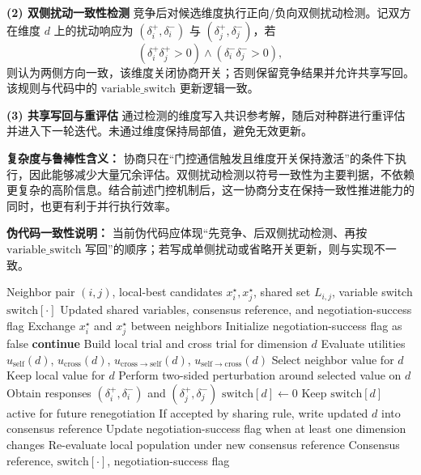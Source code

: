 \documentclass[conference]{IEEEtran}
\begin{document}
\textbf{(2) 双侧扰动一致性检测}  
竞争后对候选维度执行正向/负向双侧扰动检测。记双方在维度 \(d\) 上的扰动响应为
\((\delta_i^+,\delta_i^-)\) 与 \((\delta_j^+,\delta_j^-)\)，若
\[
(\delta_i^+\delta_j^+>0)\land(\delta_i^-\delta_j^->0),
\]
则认为两侧方向一致，该维度关闭协商开关；否则保留竞争结果并允许共享写回。该规则与代码中的 \(\mathrm{variable\_switch}\) 更新逻辑一致。

\textbf{(3) 共享写回与重评估}  
通过检测的维度写入共识参考解，随后对种群进行重评估并进入下一轮迭代。未通过维度保持局部值，避免无效更新。

\textbf{复杂度与鲁棒性含义：}
协商只在“门控通信触发且维度开关保持激活”的条件下执行，因此能够减少大量冗余评估。双侧扰动检测以符号一致性为主要判据，不依赖更复杂的高阶信息。结合前述门控机制后，这一协商分支在保持一致性推进能力的同时，也更有利于并行执行效率。

\textbf{伪代码一致性说明：} 当前伪代码应体现“先竞争、后双侧扰动检测、再按 \(\mathrm{variable\_switch}\) 写回”的顺序；若写成单侧扰动或省略开关更新，则与实现不一致。

\begin{algorithm}[t]
  \footnotesize
  \caption{Negotiation with Two-Sided Consistency Check (Abstract)}
  \label{alg:negotiation_consistency}
  \begin{algorithmic}[1]
  \Require Neighbor pair $(i,j)$, local-best candidates $x_i^\star,x_j^\star$, shared set $L_{i,j}$, variable switch $\mathrm{switch}[\cdot]$
  \Ensure Updated shared variables, consensus reference, and negotiation-success flag
  \State Exchange $x_i^\star$ and $x_j^\star$ between neighbors
  \State Initialize negotiation-success flag as false
      \State \textbf{continue} 
    \EndIf
    \State Build local trial and cross trial for dimension $d$
    \State Evaluate utilities $u_{\mathrm{self}}(d)$, $u_{\mathrm{cross}}(d)$,
    \Statex \hspace{1.5em}$u_{\mathrm{cross}\rightarrow\mathrm{self}}(d)$, $u_{\mathrm{self}\rightarrow\mathrm{cross}}(d)$
      \State Select neighbor value for $d$
    \Else
      \State Keep local value for $d$
    \EndIf
    \State Perform two-sided perturbation around selected value on $d$
    \State Obtain responses $(\delta_i^+,\delta_i^-)$ and $(\delta_j^+,\delta_j^-)$
      \State $\mathrm{switch}[d]\gets 0$ 
    \Else
      \State Keep $\mathrm{switch}[d]$ active for future renegotiation
    \EndIf
    \State If accepted by sharing rule, write updated $d$ into consensus reference
    \State Update negotiation-success flag when at least one dimension changes
  \EndFor
  \State Re-evaluate local population under new consensus reference
  \State \Return Consensus reference, $\mathrm{switch}[\cdot]$, negotiation-success flag
  \end{algorithmic}
  \end{algorithm}
\end{document}
